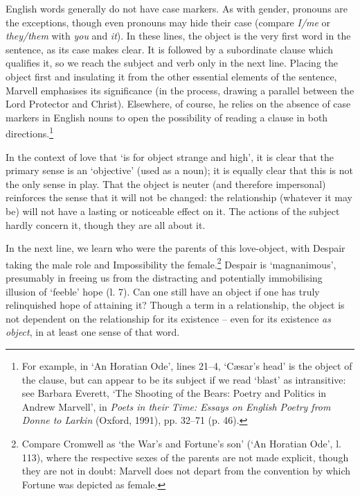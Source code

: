 ﻿\documentclass[12pt]{article}
\newcommand{\citedtitle}[1]{\textit{#1}}
\begin{document}
English
words generally do not have case markers. As with gender, pronouns are the
exceptions, though even pronouns may hide their case (compare \emph{I/me} or \emph{they/them} with \emph{you} and \emph{it}). In these lines, the
object is the very first word in the sentence, as its case makes clear. It is
followed by a subordinate clause which qualifies it, so we reach the subject
and verb only in the next line. Placing the object first and insulating it from
the other essential elements of the sentence, Marvell emphasises its
significance (in the process, drawing a parallel between the Lord Protector and
Christ). Elsewhere, of course, he relies on the absence of case markers in
English nouns to open the possibility of reading a clause in both directions.\footnote{For example, in ‘An
Horatian Ode’, lines 21–4, ‘Cæsar’s head’ is the object of the clause, but can
appear to be its subject if we read ‘blast’ as intransitive: see Barbara
Everett, ‘The Shooting of the Bears: Poetry and Politics in Andrew Marvell’, in
\citedtitle{Poets in their Time: Essays on English Poetry from Donne to Larkin} (Oxford, 1991), pp. 32–71
(p. 46).}

In
the context of love that ‘is for object strange and high’, it is clear that the
primary sense is an ‘objective’ (used as a noun); it is equally clear that this
is not the only sense in play. That the object is neuter (and therefore
impersonal) reinforces the sense that it will not be changed: the relationship
(whatever it may be) will not have a lasting or noticeable effect on it. The
actions of the subject hardly concern it, though they are all about it.

In the next line, we learn who were the parents of this love-object, with Despair
taking the male role and Impossibility the female.\footnote{Compare Cromwell as
‘the War’s and Fortune’s son’ (‘An Horatian Ode’, l. 113), where the respective
sexes of the parents are not made explicit, though they are not in doubt:
Marvell does not depart from the convention by which Fortune was depicted as
female.} Despair
is ‘magnanimous’, presumably in freeing us from the distracting and potentially
immobilising illusion of ‘feeble’ hope (l. 7). Can one still have an object if
one has truly relinquished hope of attaining it? Though a term in a
relationship, the object is not dependent on the relationship for its existence
– even for its existence \emph{as object}, in at least one sense of that
word.
\end{document}
